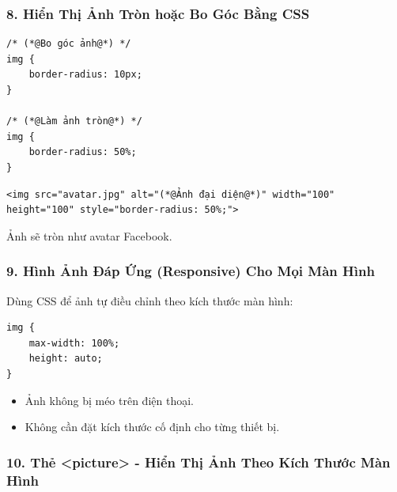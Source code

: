 \documentclass[11pt,oneside]{book}
\begin{document}
\subsubsection{8. Hiển Thị Ảnh Tròn hoặc Bo Góc Bằng CSS}

\begin{codeWindow}
\begin{lstlisting}[language=HTML5]
/* (*@Bo góc ảnh@*) */
img {
    border-radius: 10px;
}

/* (*@Làm ảnh tròn@*) */
img {
    border-radius: 50%;
}
\end{lstlisting}
\end{codeWindow}

\begin{codeWindow}
\begin{lstlisting}[language=HTML5]
<img src="avatar.jpg" alt="(*@Ảnh đại diện@*)" width="100" height="100" style="border-radius: 50%;">
\end{lstlisting}
\end{codeWindow}

Ảnh sẽ tròn như avatar Facebook.

\subsubsection{9. Hình Ảnh Đáp Ứng (Responsive) Cho Mọi Màn Hình}

Dùng CSS để ảnh tự điều chỉnh theo kích thước màn hình:

\begin{codeWindow}
\begin{lstlisting}[language=HTML5]
img {
    max-width: 100%;
    height: auto;
}
\end{lstlisting}
\end{codeWindow}

\begin{tipBox}
\begin{itemize}[leftmargin=1.5em, itemsep=2pt, parsep=0pt]
    \item Ảnh không bị méo trên điện thoại.
    \item Không cần đặt kích thước cố định cho từng thiết bị.
\end{itemize}
\end{tipBox}

\subsubsection{10. Thẻ <picture> - Hiển Thị Ảnh Theo Kích Thước Màn Hình}
\end{document}
